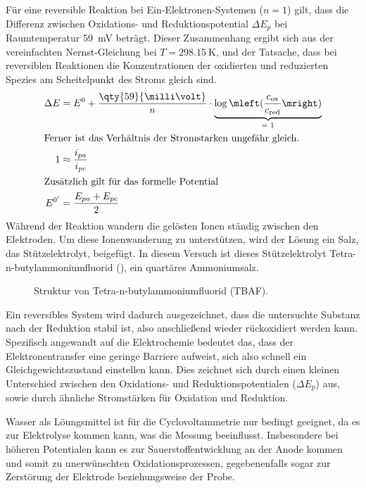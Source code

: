 Für eine reversible Reaktion bei Ein-Elektronen-Systemen ($n = 1$) gilt, dass die Differenz zwischen Oxidations- und Reduktionspotential $\Delta E_p$ bei Raumtemperatur \qty{59}{\milli\volt} beträgt.
Dieser Zusammenhang ergibt sich aus der vereinfachten Nernst-Gleichung bei $T = \qty{298.15}{\kelvin}$, und der Tatsache, dass bei reversiblen Reaktionen die Konzentrationen der oxidierten und reduzierten Spezies am Scheitelpunkt des Stroms gleich sind.
\begin{align}
    \Delta E &= E^0 + \frac{\qty{59}{\milli\volt}}{n} \cdot \underbrace{\log \mleft( \frac{c_{\text{ox}}}{c_{\text{red}}} \mright)}_{\text{= 1}} \\
\intertext{Ferner ist das Verhältnis der Stromstarken ungefähr gleich.}
        1 &\approx \frac{i_{pa}}{i_{pc}} \\
\intertext{Zusätzlich gilt für das formelle Potential}
        E^{0'} &= \frac{E_{pa} + E_{pc}}{2}
\end{align}
Während der Reaktion wandern die gelösten Ionen ständig zwischen den Elektroden.
Um diese Ionenwanderung zu unterstützen, wird der Lösung ein Salz, das Stützelektrolyt, beigefügt.
In diesem Versuch ist dieses Stützelektrolyt Tetra-n-butylammoniumfluorid (), ein quartäres Ammoniumsalz.
\begin{figure}[H]
    \centering
    \caption{Struktur von Tetra-n-butylammoniumfluorid (TBAF).}
\end{figure}
Ein reversibles System wird dadurch ausgezeichnet, dass die untersuchte Substanz nach der Reduktion stabil ist, also anschließend wieder rückoxidiert werden kann.
Spezifisch angewandt auf die Elektrochemie bedeutet das, dass der Elektronentransfer eine geringe Barriere aufweist, sich also schnell ein Gleichgewichtszustand einstellen kann.
Dies zeichnet sich durch einen kleinen Unterschied zwischen den Oxidations- und Reduktionspotentialen ($\Delta E_p$) aus, sowie durch ähnliche Stromstärken für Oxidation und Reduktion.

Wasser als Löungsmittel ist für die Cyclovoltammetrie nur bedingt geeignet, da es zur Elektrolyse kommen kann, was die Messung beeinflusst.
Insbesondere bei höheren Potentialen kann es zur Sauerstoffentwicklung an der Anode kommen und somit zu unerwünschten Oxidationsprozessen, gegebenenfalls sogar zur Zerstörung der Elektrode beziehungsweise der Probe.

